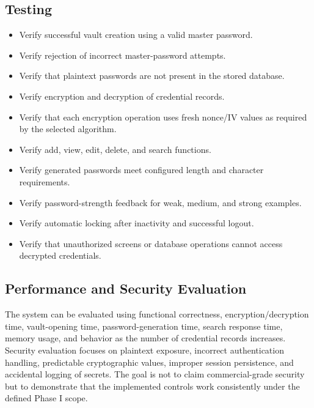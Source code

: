 \documentclass[12pt,a4paper,oneside]{report}
\begin{document}
\subsection{Testing}

\begin{itemize}
\item Verify successful vault creation using a valid master password.
\item Verify rejection of incorrect master-password attempts.
\item Verify that plaintext passwords are not present in the stored database.
\item Verify encryption and decryption of credential records.
\item Verify that each encryption operation uses fresh nonce/IV values as required by the selected algorithm.
\item Verify add, view, edit, delete, and search functions.
\item Verify generated passwords meet configured length and character requirements.
\item Verify password-strength feedback for weak, medium, and strong examples.
\item Verify automatic locking after inactivity and successful logout.
\item Verify that unauthorized screens or database operations cannot access decrypted credentials.
\end{itemize}

\subsection{Performance and Security Evaluation}

The system can be evaluated using functional correctness, encryption/decryption time, vault-opening time, password-generation time, search response time, memory usage, and behavior as the number of credential records increases. Security evaluation focuses on plaintext exposure, incorrect authentication handling, predictable cryptographic values, improper session persistence, and accidental logging of secrets. The goal is not to claim commercial-grade security but to demonstrate that the implemented controls work consistently under the defined Phase I scope.
\end{document}
